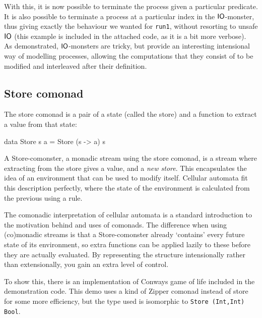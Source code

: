 With this, it is now possible to terminate the process given a particular predicate. It is also possible to terminate a process at a particular index in the $\mathsf{IO}$-monster, thus giving exactly the behaviour we wanted for \verb+run1+, without resorting to unsafe $\mathsf{IO}$ (this example is included in the attached code, as it is a bit more verbose). \\

As demonstrated, $\mathsf{IO}$-monsters are tricky, but provide an interesting intensional way of modelling processes, allowing the computations that they consist of to be modified and interleaved after their definition.
 
\subsection{Store comonad}

The store comonad is a pair of a state (called the store) and a function to extract a value from that state:

\begin{haskell}
data Store s a = Store (s -> a) s
\end{haskell}

A Store-comonster, a monadic stream using the store comonad, is a stream where extracting from the store gives a value, and a \emph{new store}. This encapsulates the idea of an environment that can be used to modify itself. Cellular automata fit this description perfectly, where the state of the environment is calculated from the previous using a rule. 

The comonadic interpretation of cellular automata is a standard introduction to the motivation behind and uses of comonads. The difference when using (co)monadic streams is that a Store-comonster already `contains' every future state of its environment, so extra functions can be applied lazily to these before they are actually evaluated. By representing the structure intensionally rather than extensionally, you gain an extra level of control.

To show this, there is an implementation of Conways game of life included in the demonstration code. This demo uses a kind of Zipper comonad instead of store for some more efficiency, but the type used is isomorphic to \verb+Store (Int,Int) Bool+.
